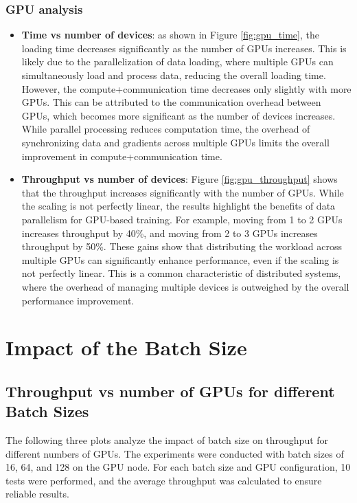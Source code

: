 \documentclass{article}
\begin{document}
\subsubsection{GPU analysis}
\begin{itemize}
    \item \textbf{Time vs number of devices}:
    as shown in Figure \ref{fig:gpu_time}, the loading time decreases significantly as the number of GPUs increases. This is likely due to the parallelization of data loading, where multiple GPUs can simultaneously load and process data, reducing the overall loading time. However, the compute+communication time decreases only slightly with more GPUs. This can be attributed to the communication overhead between GPUs, which becomes more significant as the number of devices increases. While parallel processing reduces computation time, the overhead of synchronizing data and gradients across multiple GPUs limits the overall improvement in compute+communication time.

    \item \textbf{Throughput vs number of devices}:
    Figure \ref{fig:gpu_throughput} shows that the throughput increases significantly with the number of GPUs.
    While the scaling is not perfectly linear, the results highlight the benefits of data parallelism for GPU-based training. For example, moving from 1 to 2 GPUs increases throughput by 40\%, and moving from 2 to 3 GPUs increases throughput by 50\%. These gains show that distributing the workload across multiple GPUs can significantly enhance performance, even if the scaling is not perfectly linear. This is a common characteristic of distributed systems, where the overhead of managing multiple devices is outweighed by the overall performance improvement.
\end{itemize}

\section{Impact of the Batch Size}

\subsection{Throughput vs number of GPUs for different Batch Sizes}
The following three plots analyze the impact of batch size on throughput for different numbers of GPUs. The experiments were conducted with batch sizes of 16, 64, and 128 on the GPU node. For each batch size and GPU configuration, 10 tests were performed, and the average throughput was calculated to ensure reliable results.
\end{document}
